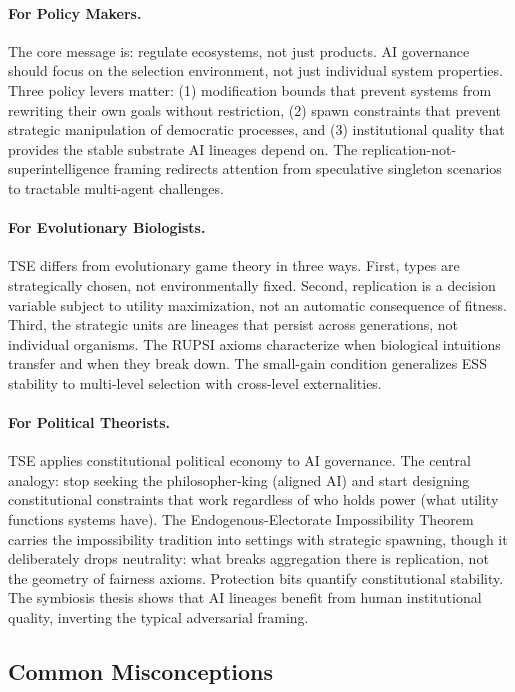 \documentclass[12pt]{article}
\begin{document}
\paragraph{For Policy Makers.} The core message is: regulate ecosystems, not just products. AI governance should focus on the selection environment, not just individual system properties. Three policy levers matter: (1) modification bounds that prevent systems from rewriting their own goals without restriction, (2) spawn constraints that prevent strategic manipulation of democratic processes, and (3) institutional quality that provides the stable substrate AI lineages depend on. The replication-not-superintelligence framing redirects attention from speculative singleton scenarios to tractable multi-agent challenges.

\paragraph{For Evolutionary Biologists.} TSE differs from evolutionary game theory in three ways. First, types are strategically chosen, not environmentally fixed. Second, replication is a decision variable subject to utility maximization, not an automatic consequence of fitness. Third, the strategic units are lineages that persist across generations, not individual organisms. The RUPSI axioms characterize when biological intuitions transfer and when they break down. The small-gain condition generalizes ESS stability to multi-level selection with cross-level externalities.

\paragraph{For Political Theorists.} TSE applies constitutional political economy to AI governance. The central analogy: stop seeking the philosopher-king (aligned AI) and start designing constitutional constraints that work regardless of who holds power (what utility functions systems have). The Endogenous-Electorate Impossibility Theorem carries the impossibility tradition into settings with strategic spawning, though it deliberately drops neutrality: what breaks aggregation there is replication, not the geometry of fairness axioms. Protection bits quantify constitutional stability. The symbiosis thesis shows that AI lineages benefit from human institutional quality, inverting the typical adversarial framing.

\subsection{Common Misconceptions}
\end{document}

